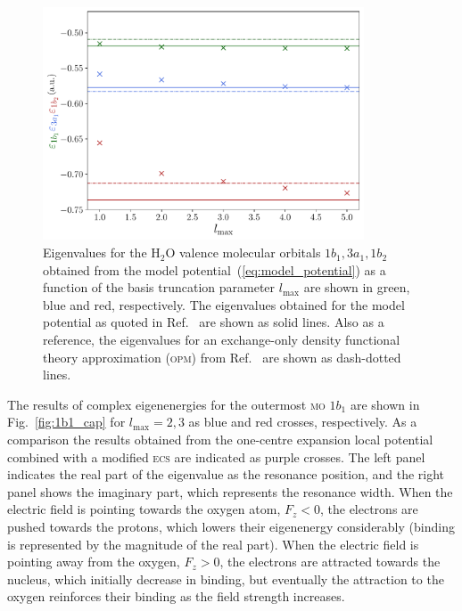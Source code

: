 \begin{figure}
  \centering
  \includegraphics[width=0.85\textwidth]{figures/ch_H2O/partial_wave/eigenvalues_fieldfree.pdf}
  \caption{Eigenvalues for the H$_{2}$O valence molecular orbitals
    $1b_{1}, 3a_{1}, 1b_{2}$ obtained from the model
    potential~(\ref{eq:model_potential}) as a function of the basis
    truncation parameter $l_{\mathrm{max}}$ are shown in green, blue
    and red, respectively. The eigenvalues obtained for the model
    potential as quoted in Ref.~\cite{illescas_2015} are shown as
    solid lines. Also as a reference, the eigenvalues for an
    exchange-only density functional theory approximation
    (\textsc{opm}) from Ref.~\cite{opm_2007} are shown as dash-dotted
    lines.}
  \label{fig:energies_fieldfree}
\end{figure}

The results of complex eigenenergies for the outermost \textsc{mo}
$1b_{1}$ are shown in Fig.~\ref{fig:1b1_cap} for $l_{\mathrm{max}} =
2,3$ as blue and red crosses, respectively. As a comparison the
results obtained from the one-centre expansion local potential
combined with a modified \textsc{ecs} are indicated as purple
crosses. The left panel indicates the real part of the eigenvalue as
the resonance position, and the right panel shows the imaginary part,
which represents the resonance width. When the electric field is
pointing towards the oxygen atom, $F_{z} < 0$, the electrons are
pushed towards the protons, which lowers their eigenenergy
considerably (binding is represented by the magnitude of the real
part). When the electric field is pointing away from the oxygen,
$F_{z} > 0$, the electrons are attracted towards the nucleus, which
initially decrease in binding, but eventually the attraction to the
oxygen reinforces their binding as the field strength increases.

